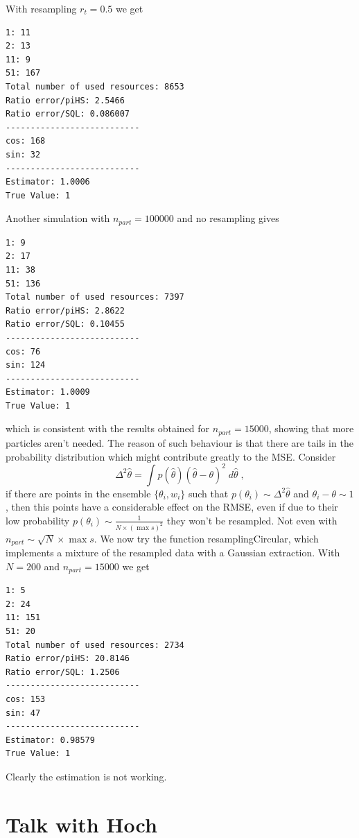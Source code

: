 \documentclass[aps, pra, 10pt, twocolumn, superscriptaddress,floatfix]{revtex4-1}
\begin{document}
With resampling $r_t = 0.5$ we get

\begin{verbatim}
1: 11
2: 13
11: 9
51: 167
Total number of used resources: 8653
Ratio error/piHS: 2.5466
Ratio error/SQL: 0.086007
---------------------------
cos: 168
sin: 32
---------------------------
Estimator: 1.0006
True Value: 1
\end{verbatim}

Another simulation with $n_{part} = 100000$ and no resampling gives

\begin{verbatim}
1: 9
2: 17
11: 38
51: 136
Total number of used resources: 7397
Ratio error/piHS: 2.8622
Ratio error/SQL: 0.10455
---------------------------
cos: 76
sin: 124
---------------------------
Estimator: 1.0009
True Value: 1
\end{verbatim}

which is consistent with the results obtained for $n_{part} = 15000$, showing that more particles aren't needed. The reason of such behaviour is that there are tails in the probability distribution which might contribute greatly to the MSE. Consider
%
\begin{equation}
\Delta^2 \hat{\theta} = \int p(\hat{\theta}) ( \hat{\theta} - \theta)^2 \; d \hat{\theta} \; ,
\end{equation}
%
if there are points in the ensemble $\lbrace \theta_i, w_i \rbrace$ such that $p(\theta_i) \sim \Delta^2 \hat{\theta}$ and $\theta_i - \theta \sim 1$, then this points have a considerable effect on the RMSE, even if due to their low probability $p(\theta_i) \sim \frac{1}{N \times (\max{s})^2}$ they won't be resampled. Not even with $n_{part} \sim \sqrt{N} \times \max{s}$. We now try the function resamplingCircular, which implements a mixture of the resampled data with a Gaussian extraction. With $N = 200$ and $n_{part} = 15000$ we get

\begin{verbatim}
1: 5
2: 24
11: 151
51: 20
Total number of used resources: 2734
Ratio error/piHS: 20.8146
Ratio error/SQL: 1.2506
---------------------------
cos: 153
sin: 47
---------------------------
Estimator: 0.98579
True Value: 1
\end{verbatim}

Clearly the estimation is not working.

\section{Talk with Hoch}
\end{document}

